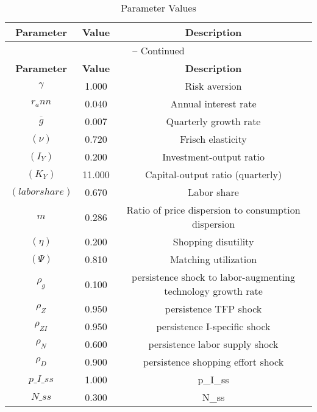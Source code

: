 \begin{center}
\begin{longtable}{ccc}
\caption{Parameter Values}\\%
\toprule%
\multicolumn{1}{c}{\textbf{Parameter}} &
\multicolumn{1}{c}{\textbf{Value}} &
 \multicolumn{1}{c}{\textbf{Description}}\\%
\midrule%
\endfirsthead
\multicolumn{3}{c}{{\tablename} \thetable{} -- Continued}\\%
\midrule%
\multicolumn{1}{c}{\textbf{Parameter}} &
\multicolumn{1}{c}{\textbf{Value}} &
  \multicolumn{1}{c}{\textbf{Description}}\\%
\midrule%
\endhead
${\gamma}$ 	 & 	 1.000 	 & 	 Risk aversion\\
${r_ann}$ 	 & 	 0.040 	 & 	 Annual interest rate\\
${\overline{g}}$ 	 & 	 0.007 	 & 	 Quarterly growth rate\\
$(\nu)$ 	 & 	 0.720 	 & 	 Frisch elasticity\\
$(I_Y)$ 	 & 	 0.200 	 & 	 Investment-output ratio\\
$(K_Y)$ 	 & 	 11.000 	 & 	 Capital-output ratio (quarterly)\\
$(labor share)$ 	 & 	 0.670 	 & 	 Labor share\\
${m}$ 	 & 	 0.286 	 & 	 Ratio of price dispersion to consumption dispersion\\
$(\eta)$ 	 & 	 0.200 	 & 	 Shopping disutility\\
$(\Psi)$ 	 & 	 0.810 	 & 	 Matching utilization\\
${\rho_g}$ 	 & 	 0.100 	 & 	 persistence shock to labor-augmenting technology growth rate\\
${\rho_Z}$ 	 & 	 0.950 	 & 	 persistence TFP shock\\
${\rho_{ZI}}$ 	 & 	 0.950 	 & 	 persistence I-specific shock\\
${\rho_N}$ 	 & 	 0.600 	 & 	 persistence labor supply shock\\
${\rho_D}$ 	 & 	 0.900 	 & 	 persistence shopping effort shock\\
$p\_I\_ss$ 	 & 	 1.000 	 & 	 p\_I\_ss\\
$N\_ss$ 	 & 	 0.300 	 & 	 N\_ss\\
\bottomrule%
\end{longtable}
\end{center}

